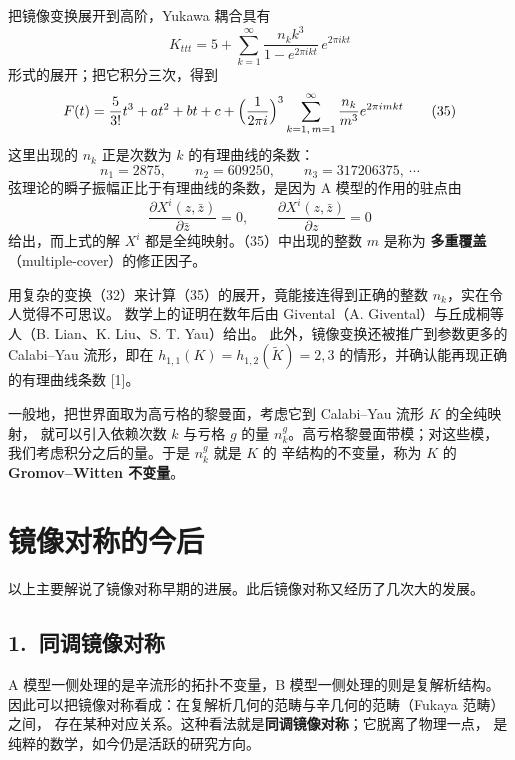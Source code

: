 把镜像变换展开到高阶，Yukawa 耦合具有
\begin{equation}
  K_{ttt}=5+\sum_{k=1}^{\infty}\frac{n_k k^3}{1-e^{2\pi ikt}}\,e^{2\pi ikt} \tag{34}
\end{equation}
形式的展开；把它积分三次，得到
\begin{equation}
  F(t)=\frac{5}{3!}t^3+at^2+bt+c
  +\Bigl(\frac{1}{2\pi i}\Bigr)^3\sum_{k=1,\,m=1}^{\infty}\frac{n_k}{m^3}
  e^{2\pi imkt} \tag{35}
\end{equation}
这里出现的 $n_k$ 正是次数为 $k$ 的有理曲线的条数：
\[
  n_1=2875,\qquad n_2=609250,\qquad n_3=317206375,\ \cdots
\]
弦理论的瞬子振幅正比于有理曲线的条数，是因为 A 模型的作用的驻点由
\begin{equation}
  \frac{\partial X^{i}(z,\bar z)}{\partial\bar z}=0,\qquad
  \frac{\partial X^{i}(z,\bar z)}{\partial z}=0 \tag{36}
\end{equation}
给出，而上式的解 $X^{i}$ 都是全纯映射。（35）中出现的整数 $m$ 是称为
\textbf{多重覆盖}（multiple-cover）的修正因子。

用复杂的变换（32）来计算（35）的展开，竟能接连得到正确的整数 $n_k$，实在令人觉得不可思议。
数学上的证明在数年后由 Givental（A. Givental）与丘成桐等人（B. Lian、K. Liu、S. T. Yau）给出。
此外，镜像变换还被推广到参数更多的 Calabi--Yau 流形，即在 $h_{1,1}(K)=h_{1,2}(\tilde K)=2,3$
的情形，并确认能再现正确的有理曲线条数 [1]。

一般地，把世界面取为高亏格的黎曼面，考虑它到 Calabi--Yau 流形 $K$ 的全纯映射，
就可以引入依赖次数 $k$ 与亏格 $g$ 的量 $n_k^{g}$。高亏格黎曼面带模；对这些模，
我们考虑积分之后的量。于是 $n_k^{g}$ 就是 $K$ 的
辛结构的不变量，称为 $K$ 的 \textbf{Gromov--Witten 不变量}。

\section*{镜像对称的今后}

以上主要解说了镜像对称早期的进展。此后镜像对称又经历了几次大的发展。

\subsection*{1.\ 同调镜像对称}

A 模型一侧处理的是辛流形的拓扑不变量，B 模型一侧处理的则是复解析结构。
因此可以把镜像对称看成：在复解析几何的范畴与辛几何的范畴（Fukaya 范畴）之间，
存在某种对应关系。这种看法就是\textbf{同调镜像对称}；它脱离了物理一点，
是纯粹的数学，如今仍是活跃的研究方向。

